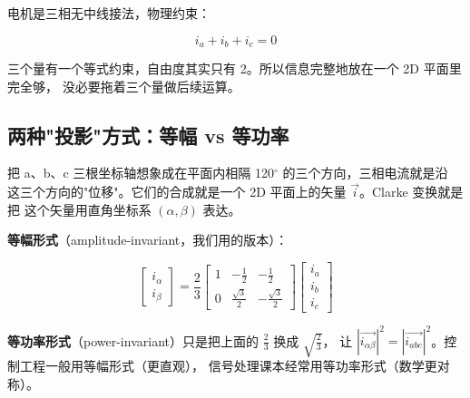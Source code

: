 \documentclass[UTF8,a4paper,11pt]{ctexart}
\begin{document}
电机是三相无中线接法，物理约束：

\[
  i_a + i_b + i_c = 0
\]

三个量有一个等式约束，自由度其实只有 2。所以信息完整地放在一个 2D 平面里完全够，
没必要拖着三个量做后续运算。

\subsection{两种"投影"方式：等幅 vs 等功率}

把 a、b、c 三根坐标轴想象成在平面内相隔 120$^\circ$ 的三个方向，三相电流就是沿
这三个方向的"位移"。它们的合成就是一个 2D 平面上的矢量 $\vec{i}$。Clarke 变换就是把
这个矢量用直角坐标系 $(\alpha, \beta)$ 表达。

\begin{center}
\end{center}

\textbf{等幅形式}（amplitude-invariant，我们用的版本）：

\[
  \begin{bmatrix} i_\alpha \\ i_\beta \end{bmatrix}
  = \frac{2}{3}
  \begin{bmatrix} 1 & -\tfrac12 & -\tfrac12 \\ 0 & \tfrac{\sqrt3}{2} & -\tfrac{\sqrt3}{2} \end{bmatrix}
  \begin{bmatrix} i_a \\ i_b \\ i_c \end{bmatrix}
\]

\textbf{等功率形式}（power-invariant）只是把上面的 $\tfrac{2}{3}$ 换成 $\sqrt{\tfrac{2}{3}}$，
让 $|\vec{i_{\alpha\beta}}|^2 = |\vec{i_{abc}}|^2$。控制工程一般用等幅形式（更直观），
信号处理课本经常用等功率形式（数学更对称）。
\end{document}
